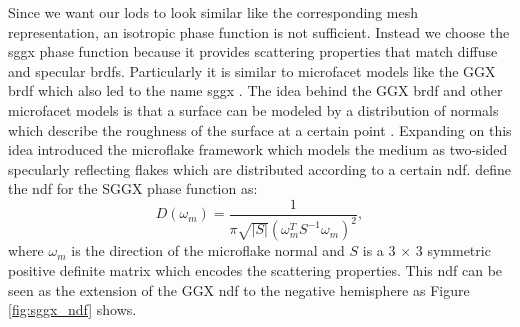 Since we want our \acp{lod} to look similar like the corresponding mesh representation, an isotropic phase function is not sufficient.
Instead we choose the \acs{sggx} phase function \cite{sggx} because it provides scattering properties that match diffuse and specular \acsp{brdf}.
Particularly it is similar to microfacet models like the GGX \acs{brdf} \cite{ggx} which also led to the name \acf{sggx} \cite{sggx}.
The idea behind the GGX \ac{brdf} and other microfacet models is that a surface can be modeled by a distribution of normals which describe the roughness of the surface at a certain point \cite{ggx}.
Expanding on this idea \citeauthor{microflake} \cite{microflake} introduced the microflake framework which models the medium as two-sided specularly reflecting flakes which are distributed according to a certain \ac{ndf}.
\citeauthor{sggx} \cite{sggx} define the \ac{ndf} for the SGGX phase function as:
\begin{equation*}
    D(\omega_m)=\frac{1}{\pi \sqrt{|S|}(\omega_m^T S^{-1} \omega_m)^2},
\end{equation*}
where $\omega_m$ is the direction of the microflake normal and $S$ is a 3 $\times$ 3 symmetric positive definite matrix which encodes the scattering properties.
This \ac{ndf} can be seen as the extension of the GGX \acs{ndf} to the negative hemisphere as Figure \ref{fig:sggx_ndf} shows.
